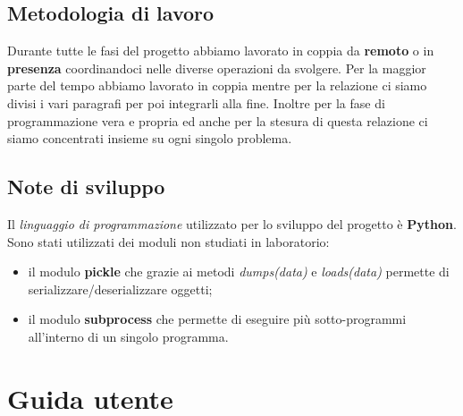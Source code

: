 \documentclass[a4paper,12pt]{report}
\begin{document}
\section{Metodologia di lavoro}

Durante tutte le fasi del progetto abbiamo lavorato in coppia da \textbf{remoto} o in \textbf{presenza} coordinandoci nelle diverse operazioni da svolgere.
%
Per la maggior parte del tempo abbiamo lavorato in coppia mentre per la relazione ci siamo divisi i vari paragrafi per poi integrarli alla fine.
%
Inoltre per la fase di programmazione vera e propria ed anche per la stesura di questa relazione ci siamo concentrati insieme su ogni singolo problema.

\section{Note di sviluppo}

Il \emph{linguaggio di programmazione} utilizzato per lo sviluppo del progetto è \textbf{Python}.
\\
Sono stati utilizzati dei moduli non studiati in laboratorio: 
\begin{itemize}
    \item il modulo \textbf{pickle} che grazie ai metodi \emph{dumps(data)} e \emph{loads(data)} permette di serializzare/deserializzare oggetti;
    \item il modulo \textbf{subprocess} che permette di eseguire più sotto-programmi all'interno di un singolo programma.
\end{itemize}

\appendix
\chapter{Guida utente}
\end{document}
